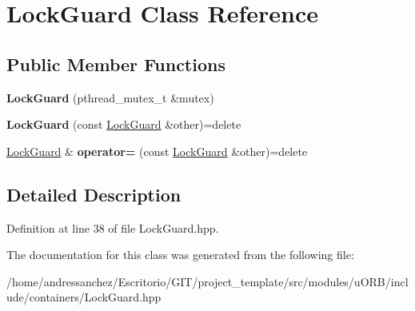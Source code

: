 \hypertarget{classLockGuard}{}\section{Lock\+Guard Class Reference}
\label{classLockGuard}
\subsection*{Public Member Functions}
\begin{DoxyCompactItemize}
\item 
\mbox{\label{classLockGuard_ab02101e6ab27b1a2b078c8cf3b3fca72}} 
{\bfseries Lock\+Guard} (pthread\+\_\+mutex\+\_\+t \&mutex)
\item 
\mbox{\label{classLockGuard_aa3b71de031859e32366fac2cde3ebcaf}} 
{\bfseries Lock\+Guard} (const \hyperlink{classLockGuard}{Lock\+Guard} \&other)=delete
\item 
\mbox{\label{classLockGuard_ad5cbce17e5d6200c16d2ef0d74e772df}} 
\hyperlink{classLockGuard}{Lock\+Guard} \& {\bfseries operator=} (const \hyperlink{classLockGuard}{Lock\+Guard} \&other)=delete
\end{DoxyCompactItemize}


\subsection{Detailed Description}


Definition at line 38 of file Lock\+Guard.\+hpp.



The documentation for this class was generated from the following file\+:\begin{DoxyCompactItemize}
\item 
/home/andressanchez/\+Escritorio/\+G\+I\+T/project\+\_\+template/src/modules/u\+O\+R\+B/include/containers/Lock\+Guard.\+hpp\end{DoxyCompactItemize}
